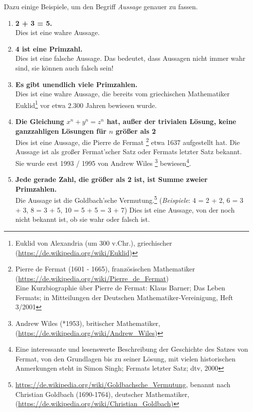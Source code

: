 \begin{Unit}[Beispiele]
Dazu einige Beispiele, um den Begriff \emph{Aussage} genauer zu fassen. 
\begin{enumerate}

\item \textbf{2 + 3 = 5.} \\
Dies ist eine wahre Aussage.

\item \textbf{4 ist eine Primzahl.} \\
Dies ist eine falsche Aussage. Das bedeutet, dass Aussagen nicht immer wahr 
sind, sie können auch falsch sein!

\item \textbf{Es gibt unendlich viele Primzahlen.} \\
Dies ist eine wahre Aussage, die bereits vom griechischen Mathematiker 
Euklid\footnote{Euklid von Alexandria (um 300 v.Chr.),
griechischer (\url{https://de.wikipedia.org/wiki/Euklid})} vor etwa 2.300 
Jahren bewiesen wurde.

\item \textbf{Die Gleichung $x^n + y^n = z^n$ hat, außer der trivialen 
Lösung, keine ganzzahligen Lösungen für $n$ größer als 2} \\
Dies ist eine Aussage, die Pierre de Fermat
\footnote{Pierre de Fermat (1601 - 1665), französischen Mathematiker 
(\url{https://de.wikipedia.org/wiki/Pierre_de_Fermat})\\
Eine Kurzbiographie über Pierre de Fermat: Klaus Barner; Das Leben Fermats; 
in Mitteilungen der Deutschen Mathematiker-Vereinigung, Heft 3/2001}
etwa 1637 aufgestellt hat. Die Aussage ist als großer Fermat'scher Satz oder 
Fermats letzter Satz bekannt. Sie wurde erst 1993 / 1995 von Andrew Wiles
\footnote{Andrew Wiles (*1953), britischer Mathematiker, 
(\url{https://de.wikipedia.org/wiki/Andrew_Wiles})} bewiesen\footnote{Eine
interessante und lesenswerte Beschreibung der Geschichte des Satzes von 
Fermat, von den Grundlagen bis zu seiner Lösung, mit vielen historischen 
Anmerkungen steht in Simon Singh; Fermats letzter Satz; dtv, 2000}.

\item \textbf{Jede gerade Zahl, die größer als 2 ist, ist Summe zweier 
Primzahlen.}\\
Die Aussage ist die Goldbach'sche Vermutung.\footnote{ 
  \url{https://de.wikipedia.org/wiki/Goldbachsche_Vermutung}, benannt nach
  Christian Goldbach (1690-1764),
  deutscher Mathematiker,
  (\url{https://de.wikipedia.org/wiki/Christian_Goldbach)}} 
(\emph{Beispiele}: 4 = 2 + 2, 6 =  3 + 3, 8 = 3 + 5, 10 = 5 + 5 = 3 + 7) 
Dies ist eine Aussage, von der noch nicht bekannt ist, ob sie wahr oder 
falsch ist.


\end{enumerate}
\end{Unit}

